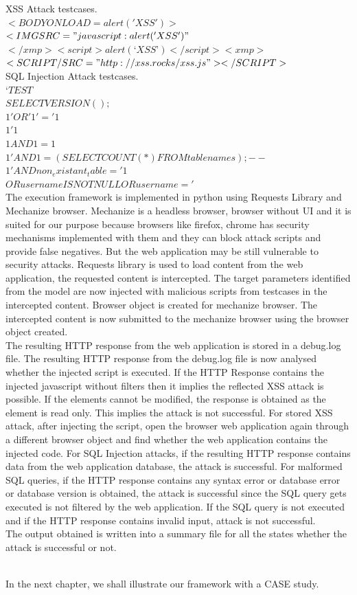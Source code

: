 XSS Attack testcases.
\\
$ <BODY ONLOAD=alert('XSS')>$\\
$<IMG SRC="javascript:alert('XSS')"$\\
$</xmp><script>alert(‘XSS’)</script><xmp>$\\
$<SCRIPT/SRC="http://xss.rocks/xss.js"></SCRIPT>$\\
\newline
SQL Injection Attack testcases.\\
$‘TEST$\\
$SELECT VERSION();$\\
$1' OR '1'='1$\\
$1'1$\\
$1 AND 1=1$\\
$1' AND 1=(SELECT COUNT(*) FROM tablenames); --$\\
$1' AND non_existant_table = '1$\\
$OR username IS NOT NULL OR username = '$\\
 \newline
The execution framework is implemented in python using Requests Library and Mechanize browser. Mechanize is a headless browser, browser without UI and it is suited for our purpose because browsers like firefox, chrome has security mechanisms implemented with them and they can block attack scripts and provide false negatives. But the web application may be still vulnerable to security attacks. Requests library is used to load content from the web application, the requested content is intercepted. The target parameters identified from the model are now injected with malicious scripts from testcases in the intercepted content. Browser object is created for mechanize browser. The intercepted content is now submitted to the mechanize browser using the browser object created.\\
\newline
The resulting HTTP response from the web application is stored in a debug.log file. The resulting HTTP response from the debug.log file is now analysed whether the injected script is executed. If the HTTP Response contains the injected javascript without filters then it implies the reflected XSS attack is possible.  If the elements cannot be modified, the response is obtained as the element is read only. This implies the attack is not successful. For stored XSS attack, after injecting the script, open the browser web application again through a different browser object and find whether the web application contains the injected code. For SQL Injection attacks, if the resulting HTTP response contains data from the web application database, the attack is successful. For malformed SQL queries, if the HTTP response contains any syntax error or database error or database version is obtained, the attack is successful since the SQL query gets executed is not filtered by the web application. If the SQL query is not executed and if the HTTP response contains invalid input, attack is not successful.\\

The output obtained is written into a summary file for all the states whether the attack is successful or not.
 

\\In the next chapter, we shall illustrate our framework with a CASE study.
